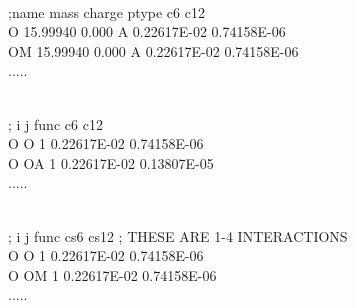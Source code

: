 \begin{tt}
[ atomtypes ]\\
;name        mass      charge   ptype            c6           c12\\
    O    15.99940       0.000       A   0.22617E-02   0.74158E-06\\
   OM    15.99940       0.000       A   0.22617E-02   0.74158E-06\\
   .....\\
\end{tt}

\begin{tt}
\\
  ; i    j func          c6           c12\\
    O    O    1 0.22617E-02   0.74158E-06\\
    O   OA    1 0.22617E-02   0.13807E-05\\
    .....\\
\end{tt}

\begin{tt}
[ pairtypes ]\\
  ; i    j func         cs6          cs12 ; THESE ARE 1-4 INTERACTIONS\\
    O    O    1 0.22617E-02   0.74158E-06\\
    O   OM    1 0.22617E-02   0.74158E-06\\
    .....\\
\end{tt}

